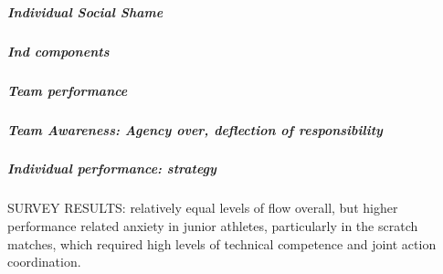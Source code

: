           \subparagraph{Individual Social Shame}

        \subparagraph{Ind components}
        \subparagraph{Team performance}


          \subparagraph{Team Awareness: Agency over, deflection of responsibility}
        \subparagraph{Individual performance: strategy}



      SURVEY RESULTS: relatively equal levels of flow overall, but higher performance related anxiety in junior athletes, particularly in the scratch matches, which required high levels of technical competence and joint action coordination.







